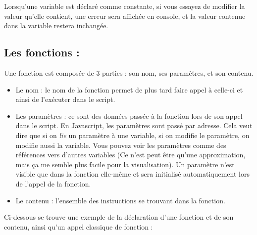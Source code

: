 \documentclass[a4paper, 11pt]{scrartcl}
\begin{document}
Lorsqu'une variable est déclaré comme constante, si vous essayez de modifier la valeur qu'elle contient, une erreur sera affichée en console, et la valeur contenue dans la variable restera inchangée.

\subsection{Les fonctions :}

Une fonction est composée de 3 parties : son nom, ses paramètres, et son contenu.

\begin{itemize}
\item Le nom : le nom de la fonction permet de plus tard faire appel à celle-ci et ainsi de l'exécuter dans le script.
\item Les paramètres : ce sont des données passée à la fonction lors de son appel dans le script.  En Javascript, les paramètres sont passé par adresse.  Cela veut dire que si on \textit{lie} un paramètre à une variable, si on modifie le paramètre, on modifie aussi la variable.  Vous pouvez voir les paramètres comme des références vers d'autres variables (Ce n'est peut être qu'une approximation, mais ça me semble plus facile pour la visualisation). Un paramètre n'est visible que dans la fonction elle-même et sera initialisé automatiquement lors de l'appel de la fonction.
\item Le contenu : l'ensemble des instructions se trouvant dans la fonction.
\end{itemize}

Ci-dessous se trouve une exemple de la déclaration d'une fonction et de son contenu, ainsi qu'un appel classique de fonction :
\end{document}
